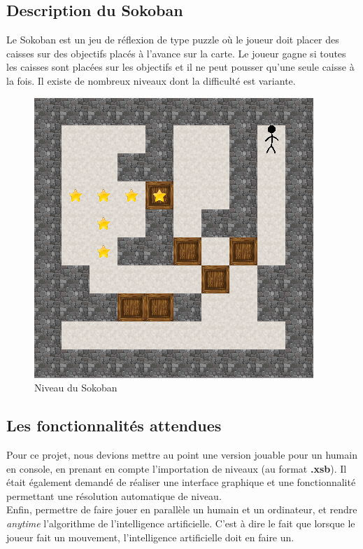 \documentclass[a4paper,12pt]{article} %
\begin{document}
\subsection*{Description du Sokoban}

Le Sokoban est un jeu de réflexion de type puzzle où le joueur doit placer des caisses sur des objectifs placés à l'avance sur la carte. Le joueur gagne si toutes les caisses sont placées sur les objectifs et il ne peut pousser qu'une seule caisse à la fois. Il existe de nombreux niveaux dont la difficulté est variante.

\begin{figure}[!h]
\centering
\includegraphics[scale=0.5]{images/sokoban.png}
\caption{Niveau du Sokoban}
\end{figure}

\subsection*{Les fonctionnalités attendues}

Pour ce projet, nous devions mettre au point une version jouable pour un humain en console, en prenant en compte l'importation de niveaux (au format \textbf{.xsb}). Il était également demandé de réaliser une interface graphique et une fonctionnalité permettant une résolution automatique de niveau.\\
Enfin, permettre de faire jouer en parallèle un humain et un ordinateur, et rendre \textit{anytime} l'algorithme de l'intelligence artificielle. C'est à dire le fait que lorsque le joueur fait un mouvement, l'intelligence artificielle doit en faire un.
\end{document}
